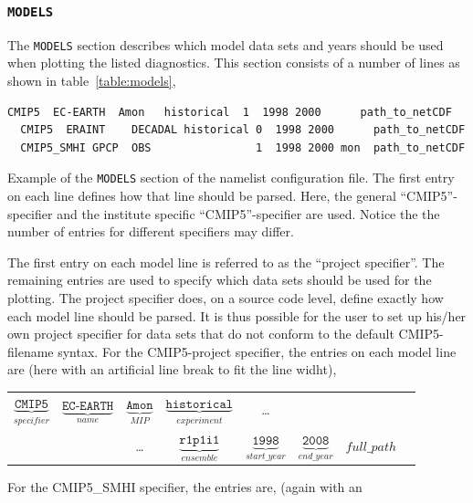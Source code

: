 \documentclass[12pt]{article}
\begin{document}
\subsubsection{\texttt{MODELS}}\label{subsubsection:models} 
The \texttt{MODELS} section describes which model data sets and years
should be used when plotting the listed diagnostics. This section
consists of a number of lines as shown in table~\ref{table:models}, 
\footnotesize
\begin{table}
\begin{Verbatim}[frame=single, fontsize=\footnotesize]
  CMIP5  EC-EARTH  Amon   historical  1  1998 2000      path_to_netCDF
  CMIP5  ERAINT    DECADAL historical 0  1998 2000      path_to_netCDF
  CMIP5_SMHI GPCP  OBS                1  1998 2000 mon  path_to_netCDF
\end{Verbatim}
\caption{Example of the \texttt{MODELS} section of the namelist
configuration file. The first entry on each line defines how that line
should be parsed. Here, the general ``CMIP5''-specifier and the
institute specific ``CMIP5''-specifier are used. Notice the the number
of entries for different specifiers may differ.}\label{table:models}
\end{table}
\normalsize
The first entry on each model line is referred to as the ``project
specifier''. The remaining entries are used to specify which data sets
should be used for the plotting. The project specifier does, on a
source code level, define exactly how each model line should be
parsed. It is thus possible for the user to set up his/her own project
specifier for data sets that do not conform to the default
CMIP5-filename syntax\cite{pcmdi-cmip5}. For the CMIP5-project
specifier, the entries on each model line are (here with an artificial
line break to fit the line widht),\\
\small
\begin{center}
\begin{tabular}{c c c c c c c c}
$\underbrace{\mathtt{CMIP5}}_{specifier}$ & %
$\underbrace{\mathtt{EC\text{-}EARTH}}_{name}$  & %
$\underbrace{\mathtt{Amon}}_{MIP}$      & %
$\underbrace{\mathtt{historical}}_{experiment}$ & \ldots & & & %
\\
 & & \ldots & $\underbrace{\mathtt{r1p1i1}}_{ensemble}$    & %
$\underbrace{\mathtt{1998}}_{start\_year}$ & %
$\underbrace{\mathtt{2008}}_{end\_year}$ & %
$full\_path$
\end{tabular}
\end{center}
\normalsize
For the CMIP5\_SMHI specifier, the entries are, (again with an
\end{document}
